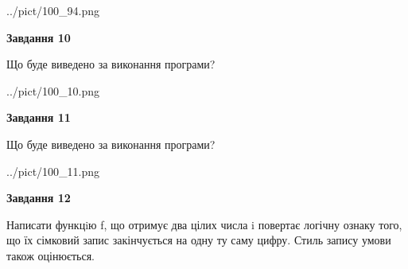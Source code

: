 \documentclass[12pt, ukrainian]{article}
\begin{document}
{\begin {large}
\begin{center}
	{../pict/100_94.png}
\end{center}
\newpage

{\begin {center}\textbf{Завдання 10}\end {center}}

Що буде виведено за виконання програми?\par
\begin{center}
	{../pict/100_10.png}
\end{center}
\newpage

{\begin {center}\textbf{Завдання 11}\end {center}}

Що буде виведено за виконання програми?\par
\begin{center}
	{../pict/100_11.png}
\end{center}
\newpage

{\begin {center}\textbf{Завдання 12}\end {center}}


Написати функцiю f, що отримує два цілих числа i повертає логічну ознаку того, що їх сімковий запис закінчується на одну ту саму цифру. Стиль запису умови також оцінюється.\par
\newpage

\end {large}}
\end{document}
